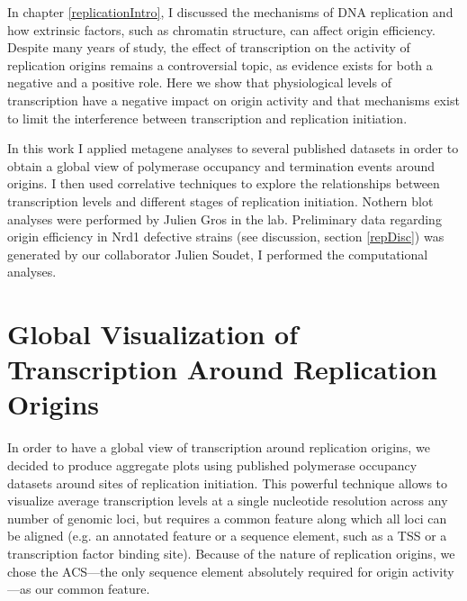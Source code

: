  \label{repRes}


In chapter \ref{replicationIntro}, I discussed the mechanisms of DNA replication and how extrinsic factors, such as chromatin structure, can affect origin efficiency. Despite many years of study, the effect of transcription on the activity of replication origins remains a controversial topic, as evidence exists for both a negative and a positive role. 
Here we show that physiological levels of transcription have a negative impact on origin activity and that mechanisms exist to limit the interference between transcription and replication initiation.

In this work I applied metagene analyses to several published datasets in order to obtain a global view of polymerase occupancy and termination events around origins. I then used correlative techniques to explore the relationships between transcription levels and different stages of replication initiation. Nothern blot analyses were performed by Julien Gros in the lab. Preliminary data regarding origin efficiency in Nrd1 defective strains (see discussion, section \ref{repDisc}) was generated by our collaborator Julien Soudet, I performed the computational analyses. 

\singlespacing
\section{Global Visualization of Transcription Around Replication Origins}
\doublespacing

In order to have a global view of transcription around replication origins, we decided to produce aggregate plots using published polymerase occupancy datasets \cite{schaughency:2014:genomewide} around sites of replication initiation. This powerful technique allows to visualize average transcription levels at a single nucleotide resolution across any number of genomic loci, but requires a common feature along which all loci can be aligned (e.g. an annotated feature or a sequence element, such as a TSS or a transcription factor binding site). Because of the nature of replication origins, we chose the ACS—the only sequence element absolutely required for origin activity—as our common feature. 

